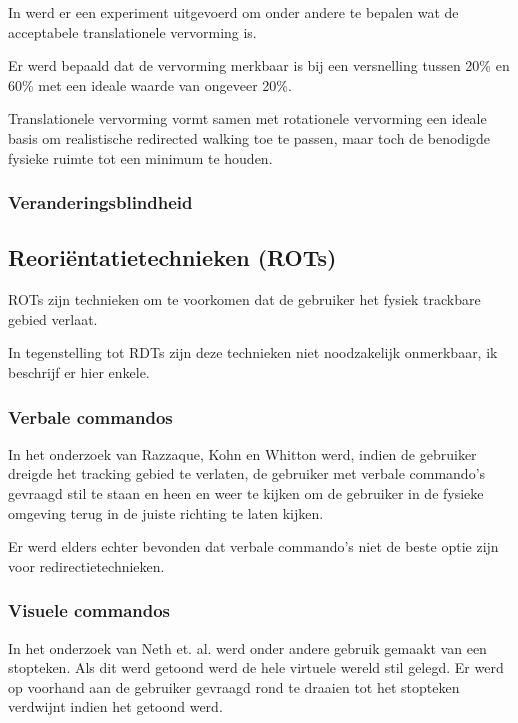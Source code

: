 \documentclass[a4paper,12pt]{article}
\begin{document}
In \cite{steinicke09} werd er een experiment uitgevoerd om onder andere te bepalen
wat de acceptabele translationele vervorming is.

Er werd bepaald dat de vervorming merkbaar is bij een versnelling tussen 20\% en
60\% met een ideale waarde van ongeveer 20\%.

Translationele vervorming vormt samen met rotationele vervorming een ideale basis 
om realistische redirected walking toe te passen, maar toch de benodigde fysieke 
ruimte tot een minimum te houden.


\subsubsection{Veranderingsblindheid}


\subsection{Reori\"entatietechnieken (ROTs)}
ROTs zijn technieken om te voorkomen dat de gebruiker het fysiek trackbare gebied
verlaat.

In tegenstelling tot RDTs zijn deze technieken niet noodzakelijk onmerkbaar, ik
beschrijf er hier enkele.


\subsubsection{Verbale commandos}
In het onderzoek van Razzaque, Kohn en Whitton \cite{kohn01} werd, indien de
gebruiker dreigde het tracking gebied te verlaten, de gebruiker met verbale
commando's gevraagd stil te staan en heen en weer te kijken om de gebruiker in
de fysieke omgeving terug in de juiste richting te laten kijken.

Er werd elders \cite{peck09} echter bevonden dat verbale commando's niet de beste 
optie zijn voor redirectietechnieken.


\subsubsection{Visuele commandos}
In het onderzoek van Neth et. al. \cite{neth12} werd onder andere gebruik gemaakt
van een stopteken. Als dit werd getoond werd de hele virtuele wereld stil gelegd.
Er werd op voorhand aan de gebruiker gevraagd rond te draaien tot het stopteken
verdwijnt indien het getoond werd.
\end{document}
